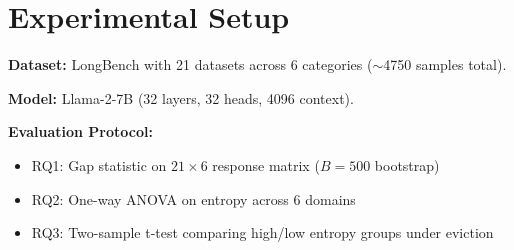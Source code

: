 \section{Experimental Setup}

\textbf{Dataset:} LongBench \citep{bai2023longbench} with 21 datasets across 6 categories ($\sim$4750 samples total).

\textbf{Model:} Llama-2-7B \citep{touvron2023llama} (32 layers, 32 heads, 4096 context).

\textbf{Evaluation Protocol:}
\begin{itemize}
    \item RQ1: Gap statistic on $21 \times 6$ response matrix ($B=500$ bootstrap)
    \item RQ2: One-way ANOVA on entropy across 6 domains
    \item RQ3: Two-sample t-test comparing high/low entropy groups under eviction
\end{itemize}
